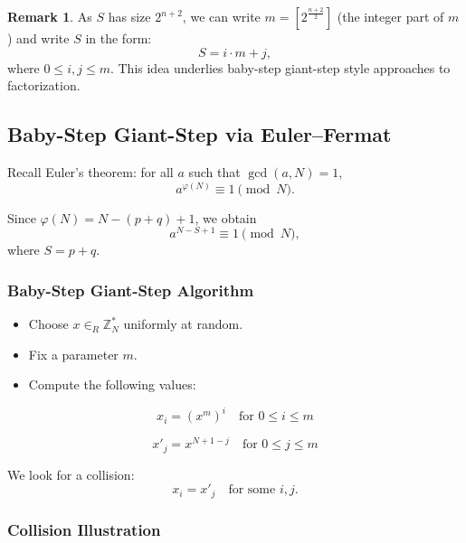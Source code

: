 \documentclass[11pt]{article}
\theoremstyle{definition}
\newtheorem{remark}{Remark}[section]
\theoremstyle{proof}
\begin{document}
	\begin{remark}
		As $S$ has size $2^{n+2}$, we can write $m = [2^{\frac{n+2}{2}}]$ (the integer part of $m$) and write $S$ in the form:
		$$
		S = i \cdot m + j,
		$$
		where $0 \leq i,j \leq  m$.
		This idea underlies baby-step giant-step style approaches to factorization.
	\end{remark}
	
	\subsection{Baby-Step Giant-Step via Euler--Fermat}
	
	Recall Euler's theorem: for all $a$ such that $\gcd(a,N)=1$,
	$$
	a^{\varphi(N)} \equiv 1 \pmod N.
	$$
	
	Since $\varphi(N) = N - (p+q) + 1$, we obtain
	$$
	a^{N - S + 1} \equiv 1 \pmod N,
	$$
	where $S = p+q$.
	
	\subsubsection{Baby-Step Giant-Step Algorithm}
	
	\begin{itemize}
		\item Choose $x \in_R \mathbb{Z}_N^*$ uniformly at random.
		\item Fix a parameter $m$.
		\item Compute the following values:
	\end{itemize}
	
	$$
	x_i = (x^m)^i \quad \text{for } 0 \leq i \leq m
	$$
	
	$$
	x'_j = x^{N+1-j} \quad \text{for } 0 \leq j \leq m
	$$
	
	We look for a collision:
	$$
	x_i = x'_j \quad \text{for some } i,j.
	$$
	
	\subsubsection{Collision Illustration}
	
\end{document}
